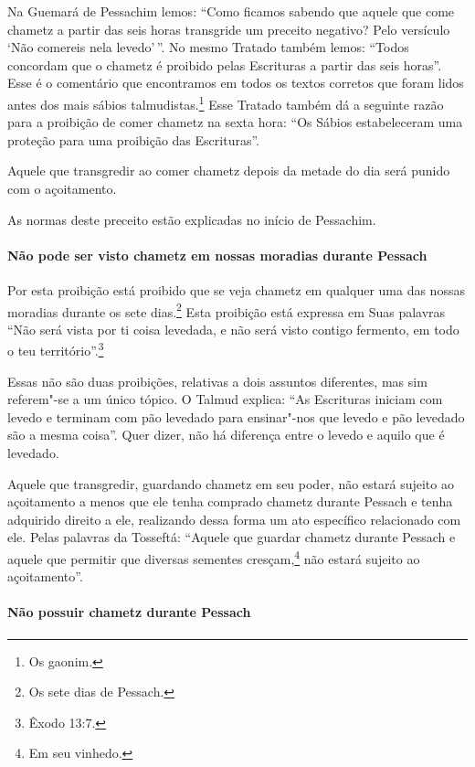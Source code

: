 \begin{multicols}{2}
Na Guemará\starr{} de Pessachim\starr{} lemos: ``Como ficamos sabendo que aquele que
come chametz\starr{} a partir das seis horas transgride um preceito negativo?
Pelo versículo `Não comereis nela levedo'\,''. No mesmo Tratado também
lemos: ``Todos concordam que o chametz\starr{} é proibido pelas Escrituras a
partir das seis horas''. Esse é o comentário que encontramos em todos os
textos corretos que foram lidos antes dos mais sábios
talmudistas.\footnote{Os gaonim\starr.} Esse Tratado também dá a seguinte
razão para a proibição de comer chametz\starr{} na sexta hora: ``Os Sábios
estabeleceram uma proteção para uma proibição das Escrituras''.

Aquele que transgredir ao comer chametz\starr{} depois da metade do dia será
punido com o açoitamento.

As normas deste preceito estão explicadas no início de Pessachim\starr.

\paragraph{Não pode ser visto chametz\starr{} em nossas moradias durante Pessach\starr{}}

Por esta proibição está proibido que se veja chametz\starr{} em qualquer uma
das nossas moradias durante os sete dias.\footnote{Os sete dias de Pessach\starr.} Esta
proibição está expressa em Suas palavras ``Não será vista por ti coisa
levedada, e não será visto contigo fermento, em todo o teu território''.\footnote{Êxodo 13:7.}

Essas não são duas proibições, relativas a dois assuntos diferentes, mas
sim referem"-se a um único tópico. O Talmud\starr{} explica: ``As Escrituras
iniciam com levedo e terminam com pão levedado para ensinar"-nos que
levedo e pão levedado são a mesma coisa''. Quer dizer, não há diferença
entre o levedo e aquilo que é levedado.

Aquele que transgredir, guardando chametz\starr{} em seu poder, não estará
sujeito ao açoitamento a menos que ele tenha comprado chametz\starr{}
durante Pessach\starr{} e tenha adquirido direito a ele, realizando dessa
forma um ato específico relacionado com ele. Pelas palavras da
Tosseftá\starr: ``Aquele que guardar chametz\starr{} durante Pessach\starr{} e aquele que
permitir que diversas sementes cresçam,\footnote{Em seu vinhedo.} não estará sujeito ao açoitamento''.

\paragraph{Não possuir chametz\starr{} durante Pessach\starr{}}


\end{multicols}
